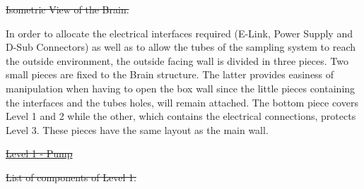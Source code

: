 \documentclass[a4paper,12pt,twoside]{article}
\providecommand{\DIFdeltex}[1]{{\protect\color{red}\sout{#1}}}                      %
\providecommand{\DIFdelbegin}{} %
\providecommand{\DIFdelend}{} %
\providecommand{\DIFdelFL}[1]{\DIFdel{#1}} %
\providecommand{\DIFdel}[1]{\texorpdfstring{\DIFdeltex{#1}}{}} %
\newcommand{\DIFscaledelfig}{0.5}
\newlength{\DIFdelgraphicswidth} %
\newlength{\DIFdelgraphicsheight} %
\newcommand{\DIFdelincludegraphics}[2][]{%
\sbox{\DIFdelgraphicsbox}{\DIFOincludegraphics[#1]{#2}}%
\settoboxwidth{\DIFdelgraphicswidth}{\DIFdelgraphicsbox} %
\settoboxtotalheight{\DIFdelgraphicsheight}{\DIFdelgraphicsbox} %
\scalebox{\DIFscaledelfig}{%
\parbox[b]{\DIFdelgraphicswidth}{\usebox{\DIFdelgraphicsbox}\\[-\baselineskip] \rule{\DIFdelgraphicswidth}{0em}}\llap{\resizebox{\DIFdelgraphicswidth}{\DIFdelgraphicsheight}{%
\setlength{\unitlength}{\DIFdelgraphicswidth}%
\begin{picture}(1,1)%
\thicklines\linethickness{2pt} %
{\color[rgb]{1,0,0}\put(0,0){\framebox(1,1){}}}%
{\color[rgb]{1,0,0}\put(0,0){\line( 1,1){1}}}%
{\color[rgb]{1,0,0}\put(0,1){\line(1,-1){1}}}%
\end{picture}%
}\hspace*{3pt}}} %
} %
\DeclareRobustCommand{\DIFdelbegin}{\DIFOdelbegin \let\includegraphics\DIFdelincludegraphics} %
\DeclareRobustCommand{\DIFdelend}{\DIFOaddend \let\includegraphics\DIFOincludegraphics} %
\begin{document}
\DIFdelbegin %
{%
\DIFdelFL{Isometric View of the Brain.}}
\DIFdelend %

\smallskip
In order to allocate the electrical interfaces required (E-Link, Power Supply and D-Sub Connectors) as well as to allow the tubes of the sampling system to reach the outside environment, the outside facing wall is divided in three pieces. Two small pieces are fixed to the Brain structure. The latter provides easiness of manipulation when having to open the box wall since the little pieces containing the interfaces and the tubes holes, will remain attached. The bottom piece covers Level 1 and 2 while the other, which contains the electrical connections, protects Level 3. These pieces have the same layout as the main wall. 





\DIFdelbegin %
\underline{\DIFdel{Level 1 - Pump}}
\DIFdelend %


\DIFdelbegin %
\DIFdel{List of components of Level 1:
}\DIFdelend %
\end{document}
